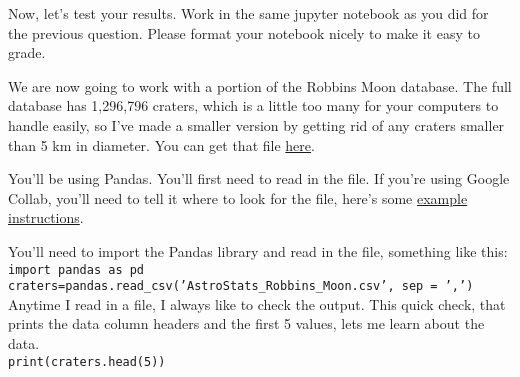 \documentclass[Assignment5_Solutions]{subfiles}
\def\code#1{\texttt{#1}}
\begin{document}
Now, let's test your results. Work in the same jupyter notebook as you did for the previous question. Please format your notebook nicely to make it easy to grade.

We are now going to work with a portion of the Robbins Moon database. The full database has 1,296,796 craters, which is a little too many for your computers to handle easily, so I've made a smaller version by getting rid of any craters smaller than 5 km in diameter. You can get that file \href{https://drive.google.com/file/d/18myP746XC0rvttoUd4XqcQKkCPKHlX6_/view?usp=sharing}{here}.

You'll be using Pandas. You'll first need to read in the file. If you're using Google Collab, you'll need to tell it where to look for the file, here's some \href{https://towardsdatascience.com/3-ways-to-load-csv-files-into-colab-7c14fcbdcb92}{example instructions}.

You'll need to import the Pandas library and read in the file, something like this:\\
\code{import pandas as pd}\\
\code{craters=pandas.read\_csv('AstroStats\_Robbins\_Moon.csv',  sep = ',')}\\

Anytime I read in a file, I always like to check the output. This quick check, that prints the data column headers and the first 5 values, lets me learn about the data.\\
\code{print(craters.head(5))}\\
\end{document}
